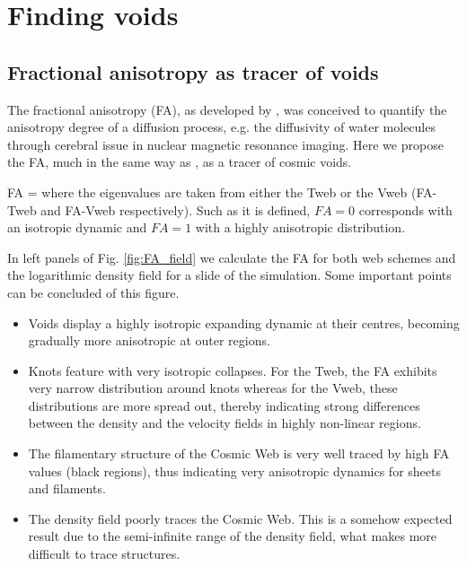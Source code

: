 \documentclass[a4,useAMS,usenatbib,usegraphicx]{latex/mn2e}
\begin{document}
\section{Finding voids}
\label{sec:bulk_voids}


\subsection{Fractional anisotropy as tracer of voids}
\label{subsec:FA_voids}


The fractional anisotropy (FA), as developed by \citet{Basser95}, was 
conceived to quantify the anisotropy degree of a diffusion process, e.g. 
the diffusivity of water molecules through cerebral issue in nuclear
magnetic resonance imaging. Here we propose the FA, much in the same 
way as \citet{Libeskind13}, as a tracer of cosmic voids.


{ FA =  }
where the eigenvalues are taken from either the Tweb or the Vweb 
(FA-Tweb and FA-Vweb respectively). Such as it is defined, $FA=0$ 
corresponds with an isotropic dynamic and $FA=1$ with a highly anisotropic 
distribution.


In left panels of Fig. \ref{fig:FA_field} we calculate the FA for both 
web schemes and the logarithmic density field for a slide of the 
simulation. Some important points can be concluded of this figure.


\begin{itemize}
\item Voids display a highly isotropic expanding dynamic at their centres, 
becoming gradually more anisotropic at outer regions.
\item Knots feature with very isotropic collapses. For the Tweb, the FA 
exhibits very narrow distribution around knots whereas for the Vweb, these
distributions are more spread out, thereby indicating strong differences 
between the density and the velocity fields in highly non-linear regions.
\item The filamentary structure of the Cosmic Web is very well traced by
high FA values (black regions), thus indicating very anisotropic dynamics 
for sheets and filaments.
\item The density field poorly traces the Cosmic Web. This is a somehow 
expected result due to the semi-infinite range of the density field, what 
makes more difficult to trace structures.
\end{itemize}
\end{document}
